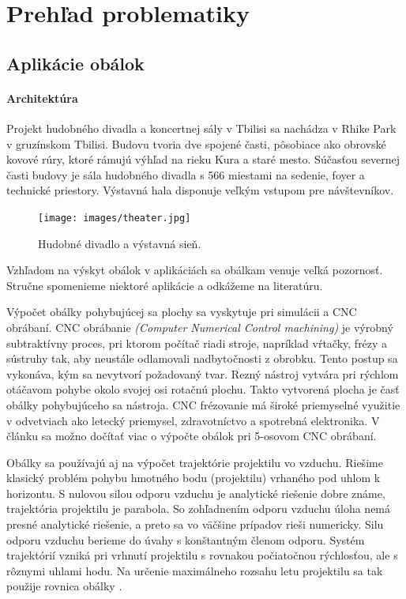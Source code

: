 \chapter{Prehľad problematiky}
\label{kap:kapitola1} %

\section{Aplikácie obálok}
\subsubsection*{Architektúra}
Projekt hudobného divadla a koncertnej sály v Tbilisi sa nachádza v Rhike Park v gruzínskom Tbilisi. Budovu tvoria dve spojené časti, pôsobiace ako obrovské kovové rúry, ktoré rámujú výhľad na rieku Kura a staré mesto. Súčasťou severnej časti budovy je sála hudobného divadla s 566 miestami na sedenie, foyer a technické priestory. Výstavná hala disponuje veľkým vstupom pre návštevníkov.

\begin{figure}[h!]
	\centering
	\texttt{[image: images/theater.jpg]}
	\caption[Hudobné divadlo a výstavná sieň.]{Hudobné divadlo a výstavná sieň. \cite{MusicTheater}}
	\label{fig:theater}
\end{figure}

Vzhľadom na výskyt obálok v aplikáciách sa obálkam venuje veľká pozornosť. Stručne spomenieme niektoré aplikácie a odkážeme na literatúru. 

Výpočet obálky pohybujúcej sa plochy sa vyskytuje pri simulácii a CNC obrábaní. CNC obrábanie \textit{(Computer Numerical Control machining)}  je výrobný subtraktívny proces, pri ktorom počítač riadi stroje, napríklad vŕtačky, frézy a sústruhy tak, aby neustále odlamovali nadbytočnosti z obrobku. Tento postup sa vykonáva, kým sa nevytvorí požadovaný tvar. Rezný nástroj vytvára pri rýchlom otáčavom pohybe okolo svojej osi rotačnú plochu. Takto vytvorená plocha je časť obálky pohybujúceho sa nástroja. CNC frézovanie má široké priemyselné využitie v odvetviach ako letecký priemysel, zdravotníctvo a spotrebná elektronika. V článku \cite{Skop20} sa možno dočítať viac o výpočte obálok pri 5-osovom CNC obrábaní.  

Obálky sa používajú aj na výpočet trajektórie projektilu vo vzduchu. Riešime klasický problém pohybu hmotného bodu (projektilu) vrhaného pod uhlom k horizontu. S nulovou silou odporu vzduchu je analytické riešenie dobre známe, trajektória projektilu je parabola. So zohľadnením odporu vzduchu úloha nemá presné analytické riešenie, a preto sa vo väčšine prípadov rieši numericky. Silu odporu vzduchu berieme do úvahy s konštantným členom odporu. Systém trajektórií vzniká pri vrhnutí projektilu s rovnakou počiatočnou rýchlosťou, ale s rôznymi uhlami hodu. Na určenie maximálneho rozsahu letu projektilu sa tak použije rovnica obálky \cite{Chud09}.

